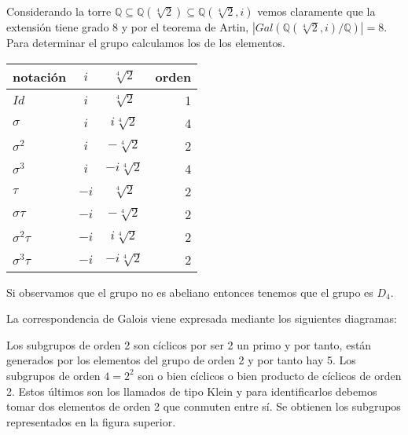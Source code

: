 \documentclass{article}
\theoremstyle{theorem-style}  %
\theoremstyle{definition-style}
\theoremstyle{example-style}
\begin{document}
\begin{enumerate}
Considerando la torre $\mathbb{Q} \subseteq \mathbb{Q}(\sqrt[4]{2}) \subseteq \mathbb{Q}(\sqrt[4]{2},i)$ vemos claramente que la extensión tiene grado 8 y por el teorema de Artin, $|Gal(\mathbb{Q}(\sqrt[4]{2},i)/\mathbb{Q})| = 8$. Para determinar el grupo calculamos los de los elementos.

\begin{center}
  \begin{tabular}{ l | c | c | r }
    \hline
    notación & $i$ & $\sqrt[4]{2}$ & orden \\ \hline
    $Id$ & $i$ & $\sqrt[4]{2}$ & 1 \\ \hline
    $\sigma$ & $i$ & $i\sqrt[4]{2}$ & 4 \\ \hline
    $\sigma^2$ & $i$ & $-\sqrt[4]{2}$ & 2 \\ \hline
    $\sigma^3$ & $i$ & $-i\sqrt[4]{2}$ & 4 \\ \hline
    $\tau$ & $-i$ & $\sqrt[4]{2}$ & 2 \\ \hline
    $\sigma\tau$ & $-i$ & $-\sqrt[4]{2}$ & 2 \\ \hline
    $\sigma^2\tau$ & $-i$ & $i\sqrt[4]{2}$ & 2 \\ \hline
    $\sigma^3\tau$ & $-i$ & $-i\sqrt[4]{2}$ & 2 \\ 
    \hline
  \end{tabular}
\end{center}

Si observamos que el grupo no es abeliano entonces tenemos que el grupo es $D_4$. 

La correspondencia de Galois viene expresada mediante los siguientes diagramas:

\end{enumerate}

Los subgrupos de orden 2 son cíclicos por ser 2 un primo y por tanto, están generados por los elementos del grupo de orden 2 y por tanto hay 5. Los subgrupos de orden $4 = 2^2$ son o bien cíclicos o bien producto de cíclicos de orden 2. Estos últimos son los llamados de tipo Klein y para identificarlos debemos tomar dos elementos de orden 2 que conmuten entre sí. Se obtienen los subgrupos representados en la figura superior. 
\end{document}
